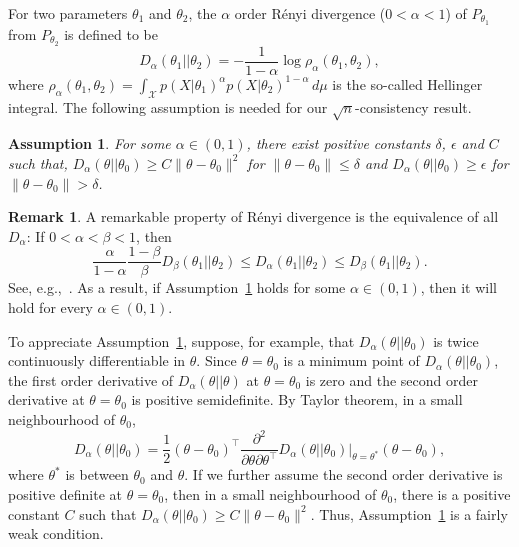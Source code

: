 \documentclass[11pt]{article}
\theoremstyle{plain}
\newtheorem{assumption}{\quad\quad Assumption}
\theoremstyle{definition}
\newtheorem{remark}{\quad\quad Remark}
\theoremstyle{remark}
\begin{document}
 For two parameters $\theta_1$ and $\theta_2$, the $\alpha$ order R\'{e}nyi divergence ($0<\alpha<1$) of $P_{\theta_1}$ from $P_{\theta_2}$ is defined to be
$$
D_{\alpha}(\theta_1||\theta_2)=-\frac{1}{1-\alpha}\log \rho_{\alpha}(\theta_1,\theta_2),
$$
where
$
\rho_{\alpha}(\theta_1,\theta_2)=\int_{\mathcal{X}} p(X|\theta_1)^{\alpha} p(X|\theta_2)^{1-\alpha} \, d \mu
$ is the so-called Hellinger integral.
The following assumption is needed for our $\sqrt{n}$-consistency result.
\begin{assumption}\label{Assumption4}
    For some $\alpha\in(0,1)$, there exist positive constants $\delta$, $\epsilon$ and $C$ such that,
     $D_{\alpha}(\theta||\theta_0)  \geq  C \|\theta-\theta_0\|^2$ for $\|\theta-\theta_0\|\leq \delta$ and $D_{\alpha}(\theta||\theta_0) \geq \epsilon$ for $\|\theta-\theta_0\|>\delta$.
\end{assumption}
\begin{remark}
    A remarkable property of R\'{e}nyi divergence is the equivalence of all $D_{\alpha}$: If $0<\alpha<\beta<1$, then
    $$
    \frac{\alpha}{1-\alpha}\frac{1-\beta}{\beta} D_{\beta}(\theta_1||\theta_2)
    \leq D_{\alpha}(\theta_1||\theta_2)\leq D_{\beta}(\theta_1||\theta_2).
    $$
    See, e.g.,~\cite{Erven2014}.
    As a result, if Assumption~\ref{Assumption4} holds for some $\alpha\in(0,1)$, then it will hold for every $\alpha\in(0,1)$.
\end{remark}
To appreciate Assumption~\ref{Assumption4},
   suppose, for example, that $D_{\alpha}(\theta||\theta_0)$ is twice continuously differentiable in $\theta$.
   Since $\theta=\theta_0$ is a minimum point of  $D_{\alpha}(\theta||\theta_0)$, the first order derivative of $D_{\alpha}(\theta||\theta)$ at $\theta=\theta_0$ is zero and the second order derivative at $\theta=\theta_0$ is positive semidefinite.
By Taylor theorem, in a small neighbourhood of $\theta_0$,
   $$
   D_{\alpha}(\theta||\theta_0)=\frac{1}{2}(\theta-\theta_0)^\top  \frac{\partial^2}{\partial \theta \partial \theta^\top } D_{\alpha}(\theta||\theta_0)\Big|_{\theta=\theta^*}  (\theta-\theta_0),
   $$
   where $\theta^*$ is between $\theta_0$ and $\theta$.
   If we further assume the second order derivative is positive definite at $\theta=\theta_0$, then in a small neighbourhood of $\theta_0$, there is a positive constant $C$ such that $D_{\alpha}(\theta||\theta_0)\geq C\|\theta-\theta_0\|^2$.
Thus, Assumption~\ref{Assumption4} is a fairly weak condition.
\end{document}
